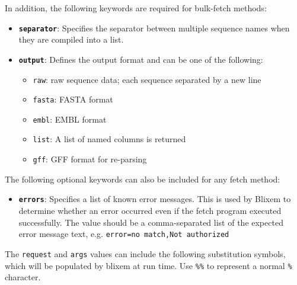 \documentclass[letterpaper]{article}
\newcommand\textstyleSourceText[1]{\texttt{#1}}
\newcommand\liststyleLii{%
\renewcommand\labelitemi{{\textbullet}}
\renewcommand\labelitemii{{\textbullet}}
\renewcommand\labelitemiii{{\textbullet}}
\renewcommand\labelitemiv{{\textbullet}}
}
\begin{document}
\bigskip

{
In addition, the following keywords are required for bulk-fetch methods:
}

\liststyleLii
\begin{itemize}
\item {\texttt{\textbf{separator}}: Specifies the separator between multiple sequence names when they are compiled into a list. }
\item {
\texttt{\textbf{output}}: Defines the output format and can be one of the following: 
\begin{itemize}
\item {\texttt{raw}: raw sequence data; each sequence separated by a new line}
\item {\texttt{fasta}: FASTA format }
\item {\texttt{embl}: EMBL format }
\item {\texttt{list}: A list of named columns is returned }
\item {\texttt{gff}: GFF format for re-parsing }
\end{itemize}}
\end{itemize}

\bigskip

{
The following optional keywords can also be included for any fetch
method: }

\liststyleLii
\begin{itemize}
\item {
\texttt{\textbf{errors}}: Specifies a list of known error messages. This
is used by Blixem to determine whether an error occurred even if the
fetch program executed successfully. The value should be a
comma-separated list of the expected error message text, e.g.
\textstyleSourceText{error={\textquotedbl}no
match{\textquotedbl},{\textquotedbl}Not
authorized{\textquotedbl}}\texttt{ }}
\end{itemize}

\bigskip

{
The \textstyleSourceText{request} and
\textstyleSourceText{\textrm{args}} values can include the following
substitution symbols, which will be populated by blixem at run time.
Use \texttt{\%\%} to represent a normal \texttt{\%} character. }
\end{document}
